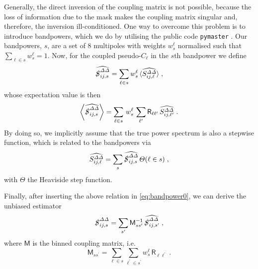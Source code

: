 \documentclass[astrosymb,twocolumn]{aastex631}
\let\Theta\varTheta
\begin{document}
Generally, the direct inversion of the coupling matrix is not possible, because the loss of information due to the mask makes the coupling matrix singular and, therefore, the inversion ill-conditioned. One way to overcome this problem is to introduce bandpowers, which we do by utilising the public code \texttt{pymaster} \citep{Alonso2019}. Our bandpowers, \(s\), are a set of \(8\) multipoles with weights \(w^\ell_s\) normalised such that \(\sum_{\ell \in s}{w^\ell_s}=1\). Now, for the coupled pseudo-\(C_\ell\) in the \(s\)th bandpower we define
\begin{equation}
 \widehat{\slashed{S}^{\varDelta\varDelta}_{ij,s}}  = \sum_{\ell \in s}{w^\ell_s}\,\langle \widehat{S^{\varDelta\varDelta}_{ij,\ell}} \rangle\;,
    \label{eq:bandpower0}
\end{equation}
whose expectation value is then
\begin{equation}
\left\langle \widehat{\slashed{S}^{\varDelta\varDelta}_{ij,s}} \right\rangle = \sum_{\ell \in s}\,{w^\ell_s}\, \sum_{\ell^\prime}\mathsf R_{\ell\ell^\prime}\,\widehat{S^{\varDelta\varDelta}_{ij,\ell^\prime}}\;.
    \label{eq:bandpower1}
\end{equation}
By doing so, we implicitly assume that the true power spectrum is also a stepwise function, which is related to the bandpowers via
\begin{equation}
\widehat{S^{\varDelta\varDelta}_{ij,\ell}} = \sum_s \widehat{\slashed{S}^{\varDelta\varDelta}_{ij,s}}\,\Theta(\ell \in s)\;,
    \label{eq:bandpower2}
\end{equation}
with \(\Theta\) the Heaviside step function.

Finally, after inserting the above relation in \autoref{eq:bandpower0}, we can derive the unbiased estimator
\begin{equation}
\slashed{S}^{\varDelta\varDelta}_{ij,s} = \sum_{s^\prime} \mathsf M^{-1}_{ss^\prime}\, \widehat{\slashed{S}^{\varDelta\varDelta}_{ij,s^\prime}}\;,
    \label{eq:bandpower3}
\end{equation}
where \(\mathsf M\) is the binned coupling matrix, i.e.\
\begin{equation}
\mathsf M_{ss^\prime}=\sum_{\ell \in s}\sum_{\ell^\prime \in s^\prime}{w^\ell_s}\, \mathsf R_{\ell\ell^\prime}\;.
    \label{eq:bandpower4}
\end{equation}
\end{document}

